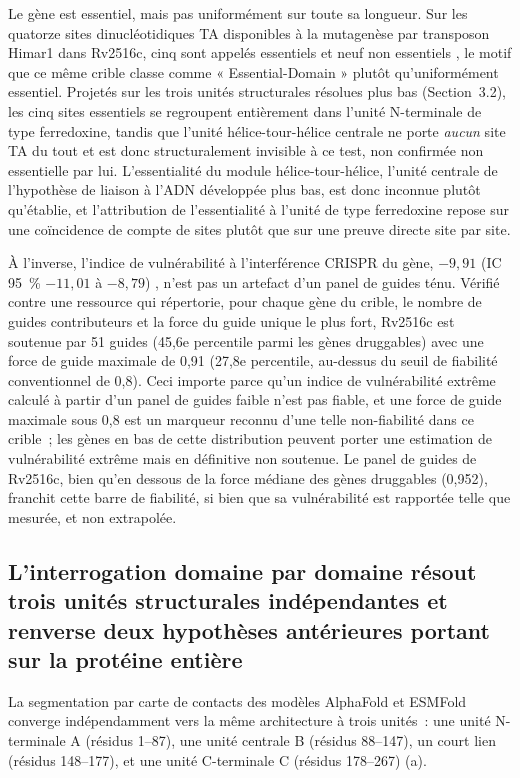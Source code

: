 \documentclass[11pt,a4paper]{article}
\begin{document}
Le gène est essentiel, mais pas uniformément sur toute sa longueur. Sur les quatorze sites
dinucléotidiques TA disponibles à la mutagenèse par transposon Himar1 dans Rv2516c, cinq sont
appelés essentiels et neuf non essentiels \citep{dejesus2017essentiality}, le motif que ce même
crible classe comme « Essential-Domain » plutôt qu'uniformément essentiel. Projetés sur les trois
unités structurales résolues plus bas (Section~3.2), les cinq sites essentiels se regroupent
entièrement dans l'unité N-terminale de type ferredoxine, tandis que l'unité hélice-tour-hélice
centrale ne porte \emph{aucun} site TA du tout et est donc structuralement invisible à ce test, non
confirmée non essentielle par lui. L'essentialité du module hélice-tour-hélice, l'unité centrale de
l'hypothèse de liaison à l'ADN développée plus bas, est donc inconnue plutôt qu'établie, et
l'attribution de l'essentialité à l'unité de type ferredoxine repose sur une coïncidence de compte
de sites plutôt que sur une preuve directe site par site.

À l'inverse, l'indice de vulnérabilité à l'interférence CRISPR du gène, $-9,91$ (IC 95~\% $-11,01$ à
$-8,79$) \citep{bosch2021vulnerability}, n'est pas un artefact d'un panel de guides ténu. Vérifié
contre une ressource qui répertorie, pour chaque gène du crible, le nombre de guides contributeurs
et la force du guide unique le plus fort, Rv2516c est soutenue par 51 guides (45,6e percentile
parmi les gènes druggables) avec une force de guide maximale de 0,91 (27,8e percentile, au-dessus
du seuil de fiabilité conventionnel de 0,8). Ceci importe parce qu'un indice de vulnérabilité
extrême calculé à partir d'un panel de guides faible n'est pas fiable, et une force de guide
maximale sous 0,8 est un marqueur reconnu d'une telle non-fiabilité dans ce crible~; les gènes en
bas de cette distribution peuvent porter une estimation de vulnérabilité extrême mais en définitive
non soutenue. Le panel de guides de Rv2516c, bien qu'en dessous de la force médiane des gènes
druggables (0,952), franchit cette barre de fiabilité, si bien que sa vulnérabilité est rapportée
telle que mesurée, et non extrapolée.

\subsection{L'interrogation domaine par domaine résout trois unités structurales indépendantes et
renverse deux hypothèses antérieures portant sur la protéine entière}

La segmentation par carte de contacts des modèles AlphaFold et ESMFold converge indépendamment vers
la même architecture à trois unités~: une unité N-terminale A (résidus 1--87), une unité centrale B
(résidus 88--147), un court lien (résidus 148--177), et une unité C-terminale C (résidus 178--267)
(a).
\end{document}
